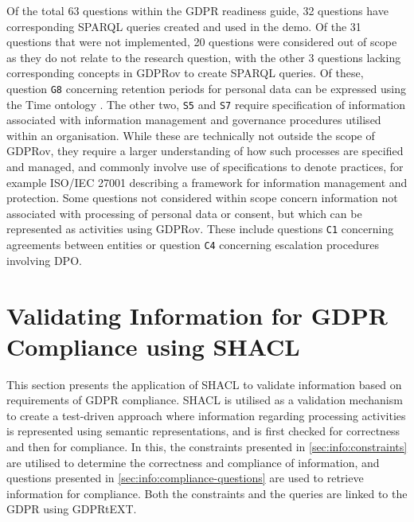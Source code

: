 Of the total 63 questions within the GDPR readiness guide, 32 questions have corresponding SPARQL queries created and used in the demo.
Of the 31 questions that were not implemented, 20 questions were considered out of scope as they do not relate to the research question, with the other 3 questions lacking corresponding concepts in GDPRov to create SPARQL queries.
Of these, question \texttt{G8} concerning retention periods for personal data can be expressed using the Time ontology \cite{cox_time_2017}.
The other two, \texttt{S5} and \texttt{S7} require specification of information associated with information management and governance procedures utilised within an organisation. While these are technically not outside the scope of GDPRov, they require a larger understanding of how such processes are specified and managed, and commonly involve use of specifications to denote practices, for example ISO/IEC 27001 describing a framework for information management and protection.
Some questions not considered within scope concern information not associated with processing of personal data or consent, but which can be represented as activities using GDPRov. These include questions \texttt{C1} concerning agreements between entities or question \texttt{C4} concerning escalation procedures involving DPO.


\section{Validating Information for GDPR Compliance using SHACL}\label{sec:testing:shacl}
This section presents the application of SHACL to validate information based on requirements of GDPR compliance.
SHACL is utilised as a validation mechanism to create a test-driven approach where information regarding processing activities is represented using semantic representations, and is first checked for correctness and then for compliance.
In this, the constraints presented in \autoref{sec:info:constraints} are utilised to determine the correctness and compliance of information, and questions presented in \autoref{sec:info:compliance-questions} are used to retrieve information for compliance.
Both the constraints and the queries are linked to the GDPR using GDPRtEXT.

